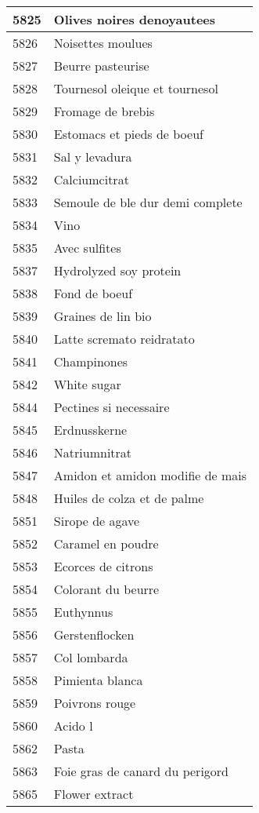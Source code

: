 \begin{longtable}{|l|l|}
5825 & Olives noires denoyautees \\ \hline 
5826 & Noisettes moulues \\ \hline 
5827 & Beurre pasteurise \\ \hline 
5828 & Tournesol oleique et tournesol \\ \hline 
5829 & Fromage de brebis \\ \hline 
5830 & Estomacs et pieds de boeuf \\ \hline 
5831 & Sal y levadura \\ \hline 
5832 & Calciumcitrat \\ \hline 
5833 & Semoule de ble dur demi complete \\ \hline 
5834 & Vino \\ \hline 
5835 & Avec sulfites \\ \hline 
5837 & Hydrolyzed soy protein \\ \hline 
5838 & Fond de boeuf \\ \hline 
5839 & Graines de lin bio \\ \hline 
5840 & Latte scremato reidratato \\ \hline 
5841 & Champinones \\ \hline 
5842 & White sugar \\ \hline 
5844 & Pectines si necessaire \\ \hline 
5845 & Erdnusskerne \\ \hline 
5846 & Natriumnitrat \\ \hline 
5847 & Amidon et amidon modifie de mais \\ \hline 
5848 & Huiles de colza et de palme \\ \hline 
5851 & Sirope de agave \\ \hline 
5852 & Caramel en poudre \\ \hline 
5853 & Ecorces de citrons \\ \hline 
5854 & Colorant du beurre \\ \hline 
5855 & Euthynnus \\ \hline 
5856 & Gerstenflocken \\ \hline 
5857 & Col lombarda \\ \hline 
5858 & Pimienta blanca \\ \hline 
5859 & Poivrons rouge \\ \hline 
5860 & Acido l \\ \hline 
5862 & Pasta \\ \hline 
5863 & Foie gras de canard du perigord \\ \hline 
5865 & Flower extract \\ \hline 

\end{longtable}

